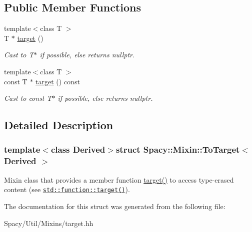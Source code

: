 \subsection*{Public Member Functions}
\begin{DoxyCompactItemize}
\item 
\hypertarget{structSpacy_1_1Mixin_1_1ToTarget_a3510786172c63a074eda127276d13392}{}{\footnotesize template$<$class T $>$ }\\T $\ast$ \hyperlink{structSpacy_1_1Mixin_1_1ToTarget_a3510786172c63a074eda127276d13392}{target} ()\label{structSpacy_1_1Mixin_1_1ToTarget_a3510786172c63a074eda127276d13392}

\begin{DoxyCompactList}\small\item\em Cast to T$\ast$ if possible, else returns nullptr. \end{DoxyCompactList}\item 
\hypertarget{structSpacy_1_1Mixin_1_1ToTarget_a98985b22f6fc98d253c8416c54a5e359}{}{\footnotesize template$<$class T $>$ }\\const T $\ast$ \hyperlink{structSpacy_1_1Mixin_1_1ToTarget_a98985b22f6fc98d253c8416c54a5e359}{target} () const \label{structSpacy_1_1Mixin_1_1ToTarget_a98985b22f6fc98d253c8416c54a5e359}

\begin{DoxyCompactList}\small\item\em Cast to const T$\ast$ if possible, else returns nullptr. \end{DoxyCompactList}\end{DoxyCompactItemize}


\subsection{Detailed Description}
\subsubsection*{template$<$class Derived$>$struct Spacy\+::\+Mixin\+::\+To\+Target$<$ Derived $>$}

Mixin class that provides a member function \hyperlink{structSpacy_1_1Mixin_1_1ToTarget_a3510786172c63a074eda127276d13392}{target()} to access type-\/erased content (see \href{http://en.cppreference.com/w/cpp/utility/functional/function/target}{\tt std\+::function\+::target()}). 

The documentation for this struct was generated from the following file\+:\begin{DoxyCompactItemize}
\item 
Spacy/\+Util/\+Mixins/target.\+hh\end{DoxyCompactItemize}
